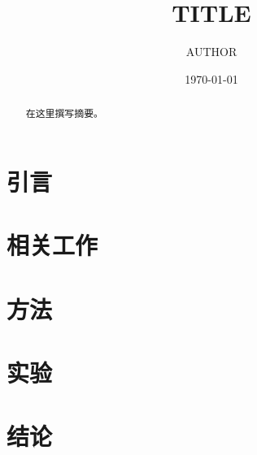 \documentclass[UTF8]{ctexart}
\title{{{TITLE}}}
\author{{{AUTHOR}}}
\date{\today}
\begin{document}
\maketitle

\begin{abstract}
在这里撰写摘要。
\end{abstract}

\section{引言}

\section{相关工作}

\section{方法}

\section{实验}

\section{结论}



\end{document}
